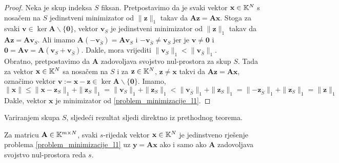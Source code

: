 \documentclass[a4paper,twoside,12pt]{memoir} %
\newcommand{\vect}[1]{\mathbf{#1}}
\renewcommand{\vec}{\vect}
\newcommand{\norm}[1]{\|{#1}\|}
\begin{document}
\begin{proof}
    Neka je skup indeksa $S$ fiksan. Pretpostavimo da je svaki vektor $\vec x \in \K^N$ s nosa\v{c}em na $S$ jedinstveni minimizator od $\norm{\vec z}_1$ takav da $\vec {Az} = \vec {Ax}$. Stoga za svaki $\vec v \in \ker \vec A \backslash \{\vec 0\}$, vektor $\vec v_S$ je jedinstveni minimizator od $\norm{\vec z}_1$ takav da $\vec{Az} = \vec{Av}_S$. Ali imamo $\vec A (-\vec v_{\bar S}) = \vec A \vec v_S$ i $-\vec v_{\bar S} \neq \vec v_S$ jer je $\vec v \neq \vec 0$ i $ \vec 0 = \vec{Av} = \vec A (\vec v_S + \vec v_{\bar S})$. Dakle, mora vrijediti $\norm{\vec v_S}_1 < \norm{\vec v_{\bar S}}_1$.\\
\indent
Obratno, pretpostavimo da $\vec A$ zadovoljava svojstvo nul-prostora za skup $S$. Tada za vektor $\vec x \in \K^N$ sa nosa\v{c}em na $S$ i za $\vec z \in \K^N$, $\vec z \neq \vec x$ takvi da $\vec{Az}=\vec{Ax}$, ozna\v{c}imo vektor $\vec v := \vec x - \vec z \in \ker \vec A \backslash \{\vec 0\}$. Imamo,
\begin{equation*}
    \norm{\vec x} \leq \norm{\vec x - \vec z_S}_1 + \norm{\vec z_S}_1 = \norm{\vec v_S}_1 + \norm{\vec z_S}_1 < \norm{\vec v_{\bar S}}_1 + \norm{\vec z_S}_1 = \norm{- \vec z_{\bar S}}_1 + \norm{\vec z_S}_1 = \norm{\vec z}_1
\end{equation*}
Dakle, vektor $\vec x$ je minimizator od \eqref{problem_minimizacije_l1}.
\end{proof}

\indent
Variranjem skupa $S$, sljede\'ci rezultat sljedi direktno iz prethodnog teorema. 

\begin{thm}\label{svojstvo_nul_prostora_tm}
    Za matricu $\vec A \in \K^{m \times N}$, svaki $s$-rijedak vektor $\vec x \in \K^N$ je jedinstveno rje\v{s}enje problema \eqref{problem_minimizacije_l1} uz $\vec y = \vec{Ax}$ ako i samo ako $\vec A$ zadovoljava svojstvo nul-prostora reda $s$.
\end{thm}
\end{document}
